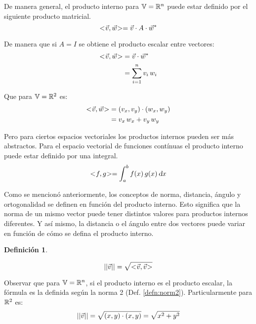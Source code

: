 \documentclass[a5paper,12pt,twoside]{book}
\newtheorem{defn}{{Definición}}[chapter]
\begin{document}
De manera general, el producto interno para $\mathbb{V} = \mathbb{R}^n$ puede estar definido por el siguiente producto matricial.
\begin{equation*}
    <\hspace{-0.8mm}\Vec{v},\Vec{w}\hspace{-0.8mm}> = \Vec{v} \cdot A \cdot \Vec{w}^*
\end{equation*}

De manera que si $A=I$ se obtiene el producto escalar entre vectores:
\begin{align*}
    <\hspace{-0.8mm}\Vec{v},\Vec{w}\hspace{-0.8mm}> &= \Vec{v} \cdot \Vec{w}^*
    \\
    &= \sum_{i=1}^n v_i \, w_i
\end{align*}

Que para $\mathbb{V} = \mathbb{R}^2$ es:
\begin{align*}
    <\hspace{-0.8mm}\Vec{v},\Vec{w}\hspace{-0.8mm}> &= (v_x,v_y) \cdot (w_x,w_y)
    \\
    &= v_x \, w_x + v_y \, w_y
\end{align*}

Pero para ciertos espacios vectoriales los productos internos pueden ser más abstractos.
Para el espacio vectorial de funciones contínuas el producto interno puede estar definido por una integral.
\begin{equation*}
    <\hspace{-0.8mm}f,g\hspace{-0.8mm}> = \int_a^b f(x) \, g(x) \, \textsl{d} x
\end{equation*}

Como se mencionó anteriormente, los conceptos de norma, distancia, ángulo y ortogonalidad se definen en función del producto interno.
Esto significa que la norma de un mismo vector puede tener distintos valores para productos internos diferentes.
Y así mismo, la distancia o el ángulo entre dos vectores puede variar en función de cómo se defina el producto interno.

\begin{mdframed}[style=DefinitionFrame]
    \begin{defn}
    \end{defn}
    \begin{equation*}
        {\left|\left| {\Vec{v}} \right|\right|} = \sqrt{<\hspace{-0.8mm}\Vec{v},\Vec{v}\hspace{-0.8mm}>}
    \end{equation*}
\end{mdframed}

Observar que para $\mathbb{V} = \mathbb{R}^n$, si el producto interno es el producto escalar, la fórmula es la definida según la norma 2 (Def. \ref{defn:norm2}).
Particularmente para $\mathbb{R}^2$ es:
\begin{equation*}
    {\left|\left| {\Vec{v}} \right|\right|} = \sqrt{(x,y) \cdot (x,y)} = \sqrt{x^2+y^2}
\end{equation*}
\end{document}
